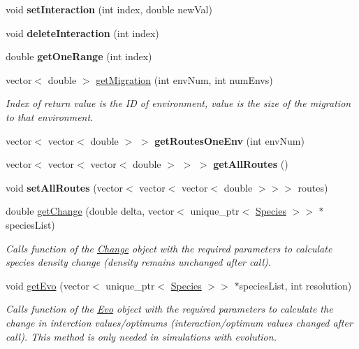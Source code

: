 \begin{DoxyCompactItemize}
void {\bfseries set\+Interaction} (int index, double new\+Val)
\item 
\hypertarget{classSpecies_ab219377e317d2c8d07a0a207f52cf3f4}{}\label{classSpecies_ab219377e317d2c8d07a0a207f52cf3f4} 
void {\bfseries delete\+Interaction} (int index)
\item 
\hypertarget{classSpecies_a3eeef473f91fe468ffd4d76964bb5f6f}{}\label{classSpecies_a3eeef473f91fe468ffd4d76964bb5f6f} 
double {\bfseries get\+One\+Range} (int index)
\item 
vector$<$ double $>$ \hyperlink{classSpecies_a306aaa396cc99e223d46a577b14e1faf}{get\+Migration} (int env\+Num, int num\+Envs)
\begin{DoxyCompactList}\small\item\em Index of return value is the ID of environment, value is the size of the migration to that environment. \end{DoxyCompactList}\item 
\hypertarget{classSpecies_a43a78cb3d46d2c02669ca80c9d0ede7b}{}\label{classSpecies_a43a78cb3d46d2c02669ca80c9d0ede7b} 
vector$<$ vector$<$ double $>$ $>$ {\bfseries get\+Routes\+One\+Env} (int env\+Num)
\item 
\hypertarget{classSpecies_a9a0c31d84cac35b7525b38919b8ad963}{}\label{classSpecies_a9a0c31d84cac35b7525b38919b8ad963} 
vector$<$ vector$<$ vector$<$ double $>$ $>$ $>$ {\bfseries get\+All\+Routes} ()
\item 
\hypertarget{classSpecies_ac64bd2c5d579d513cca4502dddbdd484}{}\label{classSpecies_ac64bd2c5d579d513cca4502dddbdd484} 
void {\bfseries set\+All\+Routes} (vector$<$ vector$<$ vector$<$ double $>$$>$$>$ routes)
\item 
\hypertarget{classSpecies_a766219b52815e5f25206084de418385e}{}\label{classSpecies_a766219b52815e5f25206084de418385e} 
double \hyperlink{classSpecies_a766219b52815e5f25206084de418385e}{get\+Change} (double delta, vector$<$ unique\+\_\+ptr$<$ \hyperlink{classSpecies}{Species} $>$$>$ $\ast$species\+List)
\begin{DoxyCompactList}\small\item\em Calls function of the \hyperlink{classChange}{Change} object with the required parameters to calculate species density change (density remains unchanged after call). \end{DoxyCompactList}\item 
\hypertarget{classSpecies_afce47f18aa0a770ddcb53dd985cf5758}{}\label{classSpecies_afce47f18aa0a770ddcb53dd985cf5758} 
void \hyperlink{classSpecies_afce47f18aa0a770ddcb53dd985cf5758}{get\+Evo} (vector$<$ unique\+\_\+ptr$<$ \hyperlink{classSpecies}{Species} $>$$>$ $\ast$species\+List, int resolution)
\begin{DoxyCompactList}\small\item\em Calls function of the \hyperlink{classEvo}{Evo} object with the required parameters to calculate the change in interction values/optimums (interaction/optimum values changed after call). This method is only needed in simulations with evolution. \end{DoxyCompactList}\end{DoxyCompactItemize}
